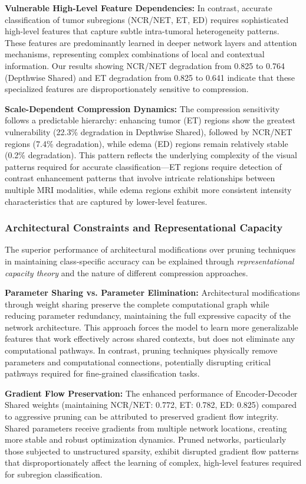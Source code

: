 \documentclass[12pt,a4paper]{article}
\begin{document}
\begin{enumerate}
\textbf{Vulnerable High-Level Feature Dependencies:} In contrast, accurate classification of tumor subregions (NCR/NET, ET, ED) requires sophisticated high-level features that capture subtle intra-tumoral heterogeneity patterns. These features are predominantly learned in deeper network layers and attention mechanisms, representing complex combinations of local and contextual information. Our results showing NCR/NET degradation from 0.825 to 0.764 (Depthwise Shared) and ET degradation from 0.825 to 0.641 indicate that these specialized features are disproportionately sensitive to compression.

\textbf{Scale-Dependent Compression Dynamics:} The compression sensitivity follows a predictable hierarchy: enhancing tumor (ET) regions show the greatest vulnerability (22.3\% degradation in Depthwise Shared), followed by NCR/NET regions (7.4\% degradation), while edema (ED) regions remain relatively stable (0.2\% degradation). This pattern reflects the underlying complexity of the visual patterns required for accurate classification—ET regions require detection of contrast enhancement patterns that involve intricate relationships between multiple MRI modalities, while edema regions exhibit more consistent intensity characteristics that are captured by lower-level features.

\subsubsection{Architectural Constraints and Representational Capacity}

The superior performance of architectural modifications over pruning techniques in maintaining class-specific accuracy can be explained through \textit{representational capacity theory} and the nature of different compression approaches.

\textbf{Parameter Sharing vs. Parameter Elimination:} Architectural modifications through weight sharing preserve the complete computational graph while reducing parameter redundancy, maintaining the full expressive capacity of the network architecture. This approach forces the model to learn more generalizable features that work effectively across shared contexts, but does not eliminate any computational pathways. In contrast, pruning techniques physically remove parameters and computational connections, potentially disrupting critical pathways required for fine-grained classification tasks.

\textbf{Gradient Flow Preservation:} The enhanced performance of Encoder-Decoder Shared weights (maintaining NCR/NET: 0.772, ET: 0.782, ED: 0.825) compared to aggressive pruning can be attributed to preserved gradient flow integrity. Shared parameters receive gradients from multiple network locations, creating more stable and robust optimization dynamics. Pruned networks, particularly those subjected to unstructured sparsity, exhibit disrupted gradient flow patterns that disproportionately affect the learning of complex, high-level features required for subregion classification.


\end{enumerate}
\end{document}
